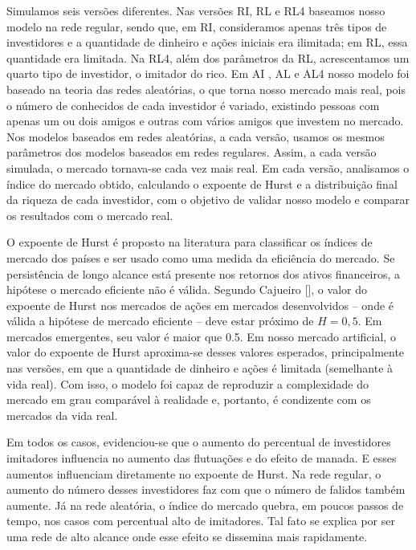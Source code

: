 \documentclass[brazil,ruledheader]{abnt}
\renewcommand{\cite}[1]{[\citeonline{#1}]}
\begin{document}
Simulamos seis versões diferentes. Nas versões RI, RL e RL4 baseamos nosso
modelo na rede regular, sendo que, em RI, consideramos apenas três tipos de
investidores e a quantidade de dinheiro e ações iniciais era ilimitada; em RL,
essa quantidade era limitada. Na RL4, além dos parâmetros da RL, acrescentamos
um quarto tipo de investidor, o imitador do rico.  Em AI , AL e AL4 nosso modelo
foi baseado na teoria das redes aleatórias, o que torna nosso mercado mais real,
pois o número de conhecidos de cada investidor é variado, existindo pessoas com
apenas um ou dois amigos e outras com vários amigos que investem no mercado. Nos
modelos baseados em redes aleatórias, a cada versão, usamos os mesmos parâmetros
dos modelos baseados em redes regulares. Assim, a cada versão simulada, o
mercado tornava-se cada vez mais real. Em cada versão, analisamos o índice do
mercado obtido, calculando o expoente de Hurst e a distribuição final da riqueza
de cada investidor, com o objetivo de validar nosso modelo e comparar os
resultados com o mercado real.  

O expoente de Hurst é proposto na literatura para classificar os índices de
mercado dos países e ser usado como uma medida da eficiência do mercado. Se
persistência de longo alcance está presente nos retornos dos ativos financeiros,
a hipótese o mercado eficiente não é válida. Segundo Cajueiro
\cite{CaTa04,CaTa08}, o valor do expoente de Hurst nos mercados de ações em
mercados desenvolvidos – onde é válida a hipótese de mercado eficiente – deve
estar próximo de $H=0,5$. Em mercados emergentes, seu valor é maior que 0.5. Em
nosso mercado artificial, o valor do expoente de Hurst aproxima-se desses
valores esperados, principalmente nas versões, em que a quantidade de dinheiro e
ações é limitada (semelhante à vida real). Com isso, o modelo foi capaz de
reproduzir a complexidade do mercado em grau comparável à realidade e, portanto,
é condizente com os mercados da vida real.                    



Em todos os casos, evidenciou-se que o aumento do percentual de investidores
imitadores influencia no aumento das flutuações e do efeito de manada. E esses
aumentos influenciam diretamente no expoente de Hurst. Na rede regular, o
aumento do número desses investidores faz com que o número de falidos também
aumente. Já na rede aleatória, o índice do mercado quebra, em poucos passos de
tempo, nos casos com percentual alto de imitadores. Tal fato se explica por ser
uma rede de alto alcance onde  esse efeito se dissemina mais rapidamente.   
\end{document}
